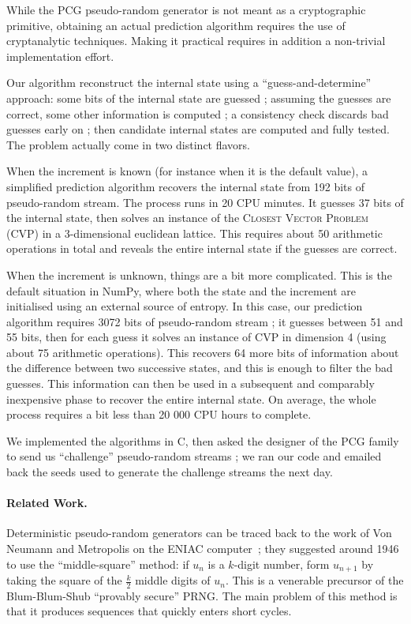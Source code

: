 \documentclass[submission,svgnames,journal=tosc]{iacrtrans}
\begin{document}
While the \textsf{PCG} pseudo-random generator is not meant as a cryptographic
primitive, obtaining an actual prediction algorithm requires the use of
cryptanalytic techniques. Making it practical requires in addition a non-trivial
implementation effort.

Our algorithm reconstruct the internal state using a ``guess-and-determine''
approach: some bits of the internal state are guessed ; assuming the guesses are
correct, some other information is computed ; a consistency check discards bad
guesses early on ; then candidate internal states are computed and fully
tested. The problem actually come in two distinct flavors.

When the increment is known (for instance when it is the default value), a
simplified prediction algorithm recovers the internal state from 192 bits of
pseudo-random stream. The process runs in 20 CPU minutes. It guesses 37 bits of
the internal state, then solves an instance of the \textsc{Closest Vector
  Problem} (CVP) in a 3-dimensional euclidean lattice. This requires about 50
arithmetic operations in total and reveals the entire internal state if the
guesses are correct.

When the increment is unknown, things are a bit more complicated. This is the
default situation in \textsf{NumPy}, where both the state and the increment are
initialised using an external source of entropy. In this case, our prediction
algorithm requires 3072 bits of pseudo-random stream ; it guesses between 51 and
55 bits, then for each guess it solves an instance of CVP in dimension 4 (using
about 75 arithmetic operations). This recovers 64 more bits of information about
the difference between two successive states, and this is enough to filter the
bad guesses. This information can then be used in a subsequent and comparably
inexpensive phase to recover the entire internal state. On average, the whole
process requires a bit less than 20 000 CPU hours to complete.

We implemented the algorithms in \textsf{C}, then asked the designer of the PCG
family to send us ``challenge'' pseudo-random streams ; we ran our code and
emailed back the seeds used to generate the challenge streams the next day.

\paragraph{Related Work.} Deterministic pseudo-random generators can be traced
back to the work of Von Neumann and Metropolis on the ENIAC
computer~\cite{vonNeumann1951}; they suggested around 1946 to use the
``middle-square'' method: if $u_n$ is a $k$-digit number, form $u_{n+1}$ by
taking the square of the $\frac{k}{2}$ middle digits of $u_n$. This is a
venerable precursor of the Blum-Blum-Shub ``provably secure'' PRNG. The main
problem of this method is that it produces sequences that quickly enters short
cycles.
\end{document}
